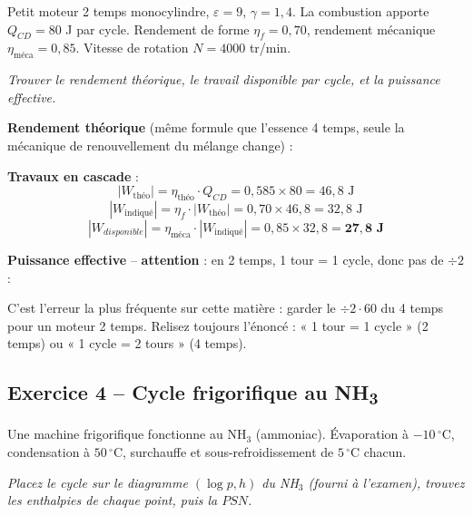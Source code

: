 \begin{enonce}
Petit moteur 2 temps monocylindre, $\varepsilon=9$, $\gamma=1{,}4$. La combustion apporte $Q_{CD}=80$ J par
cycle. Rendement de forme $\eta_f=0{,}70$, rendement mécanique $\eta_{\text{méca}}=0{,}85$.
Vitesse de rotation $N=4000$ tr/min.

\emph{Trouver le rendement théorique, le travail disponible par cycle, et la puissance effective.}
\end{enonce}

\begin{correction}
\textbf{Rendement théorique} (même formule que l'essence 4 temps, seule la mécanique de renouvellement
du mélange change) :

\textbf{Travaux en cascade} :
\[|W_{\text{théo}}|=\eta_{\text{théo}}\cdot Q_{CD}=0{,}585\times80=46{,}8\text{ J}\]
\[|W_{\text{indiqué}}|=\eta_f\cdot|W_{\text{théo}}|=0{,}70\times46{,}8=32{,}8\text{ J}\]
\[|W_{disponible}|=\eta_{\text{méca}}\cdot|W_{\text{indiqué}}|=0{,}85\times32{,}8=\mathbf{27{,}8\text{ J}}\]

\textbf{Puissance effective} -- \textbf{attention} : en 2 temps, 1 tour = 1 cycle, donc pas de
$\div 2$ :
\end{correction}

\begin{piege}
C'est l'erreur la plus fréquente sur cette matière : garder le $\div 2\cdot 60$ du 4 temps pour un moteur
2 temps. Relisez toujours l'énoncé : « 1 tour = 1 cycle » (2 temps) ou « 1 cycle = 2 tours » (4 temps).
\end{piege}

\subsection{Exercice 4 -- Cycle frigorifique au NH\textsubscript{3}}

\begin{enonce}
Une machine frigorifique fonctionne au NH$_3$ (ammoniac). Évaporation à $-10\,^\circ$C, condensation à
$50\,^\circ$C, surchauffe et sous-refroidissement de $5\,^\circ$C chacun.

\emph{Placez le cycle sur le diagramme $(\log p,h)$ du NH$_3$ (fourni à l'examen), trouvez les enthalpies
de chaque point, puis la $PSN$.}
\end{enonce}

